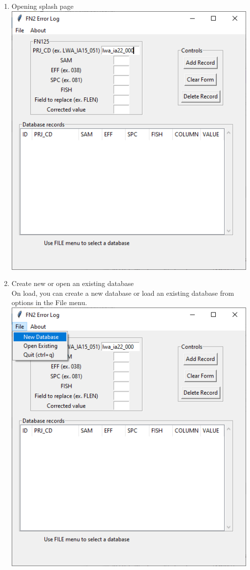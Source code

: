 \documentclass[
]{book}
\begin{document}
\begin{enumerate}
\def\labelenumi{\arabic{enumi}.}
\item
  Opening splash page\\
  \includegraphics{Figures/DataChangeDB_01.png}
\item
  Create new or open an existing database\\
  On load, you can create a new database or load an existing database from options in the File menu.
  \includegraphics{Figures/DataChangeDB_02.png}

\end{enumerate}
\end{document}
